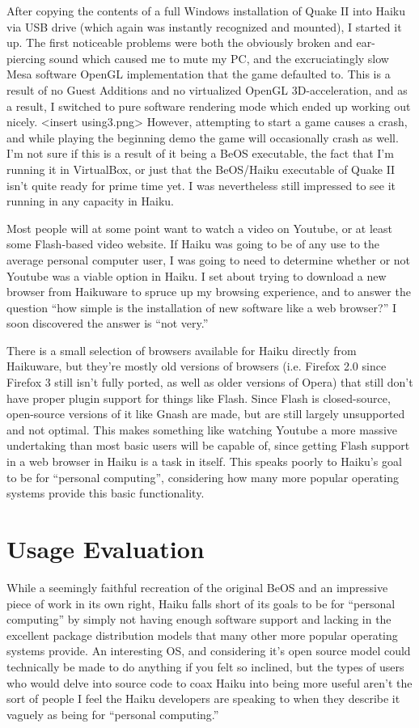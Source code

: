 \documentclass{article}
\begin{document}
After copying the contents of a full Windows installation of Quake 
II into Haiku via USB drive (which again was instantly recognized and mounted), 
I started it up. The first noticeable problems were both the obviously broken 
and ear-piercing sound which caused me to mute my PC, and the excruciatingly 
slow Mesa software OpenGL implementation that the game defaulted to. This is 
a result of no Guest Additions and no virtualized OpenGL 3D-acceleration, 
and as a result, I switched to pure software rendering mode which ended up 
working out nicely. <insert using3.png> However, attempting to start a game 
causes a crash, and while playing the beginning demo the game will occasionally 
crash as well. I’m not sure if this is a result of it being a BeOS executable, 
the fact that I’m running it in VirtualBox, or just that the BeOS/Haiku executable 
of Quake II isn’t quite ready for prime time yet. I was nevertheless still impressed 
to see it running in any capacity in Haiku.
	
Most people will at some point want to watch a video on Youtube, or at 
least some Flash-based video website. If Haiku was going to be of any use to the 
average personal computer user, I was going to need to determine whether or not 
Youtube was a viable option in Haiku. I set about trying to download a new browser 
from Haikuware to spruce up my browsing experience, and to answer the question 
“how simple is the installation of new software like a web browser?”  I soon 
discovered the answer is “not very.”

There is a small selection of browsers available for Haiku directly from Haikuware, 
but they’re mostly old versions of browsers (i.e. Firefox 2.0 since Firefox 3 still isn’t 
fully ported, as well as older versions of Opera) that still don’t have proper plugin 
support for things like Flash. Since Flash is closed-source, open-source versions 
of it like Gnash are made, but are still largely unsupported and not optimal. 
This makes something like watching Youtube a more massive undertaking than most 
basic users will be capable of, since getting Flash support in a web browser in 
Haiku is a task in itself.  This speaks poorly to Haiku’s goal to be for “personal computing”, 
considering how many more popular operating systems provide this basic functionality.

\section{Usage Evaluation}

While a seemingly faithful recreation of the original BeOS and an impressive piece of work in 
its own right, Haiku falls short of its goals to be for “personal computing” by simply not 
having enough software support and lacking in the excellent package distribution models 
that many other more popular operating systems provide. An interesting OS, and considering 
it’s open source model could technically be made to do anything if you felt so inclined, 
but the types of users who would delve into source code to coax Haiku into being more 
useful aren’t the sort of people I feel the Haiku developers are speaking to when they 
describe it vaguely as being for “personal computing.”

{}

\end{document}
